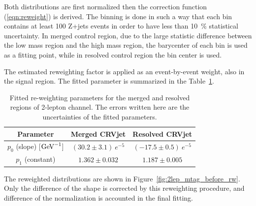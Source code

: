 Both distributions are first normalized then the correction function (\ref{eqn:reweight}) is derived. 
The binning is done in such a way that each bin contains at least 100 Z+jets events in order to have less than 10~\% statistical uncertainty. 
In merged control region, due to the large statistic difference between the low mass region and the high mass region, the barycenter of each bin is used as a fitting point, while in resolved control region the bin center is used.

The estimated reweighting factor is applied as an event-by-event weight, also in the signal region.
The fitted parameter is summarized in the Table~\ref{tab:fit}. 

\begin{table}[htbp]
 \footnotesize
\begin{center}
\begin{tabular}{ | c | c | c |}
\hline
Parameter & Merged CRVjet & Resolved CRVjet  \\
\hline
$p_{0}$ (slope) [$\mathrm{GeV}^{-1}$] & $(30.2 \pm 3.1)~e^{-5}$ &  $(-17.5 \pm 0.5)~e^{-5}$ \\
 \hline
$p_{1}$ (constant)  & $1.362 \pm 0.032$ & $1.187 \pm 0.005$ \\
\hline
\end{tabular}
\caption{\label{tab:fit} Fitted re-weighting parameters for the merged and resolved regions of 2-lepton channel. The errors written here are the uncertainties of the fitted parameters. }
  \end{center}
\end{table}



The reweighted distributions are shown in Figure~\ref{fig:2lep_mtag_before_rw}.
Only the difference of the shape is corrected by this reweighting procedure, and difference of the normalization is accounted in the final fitting.

